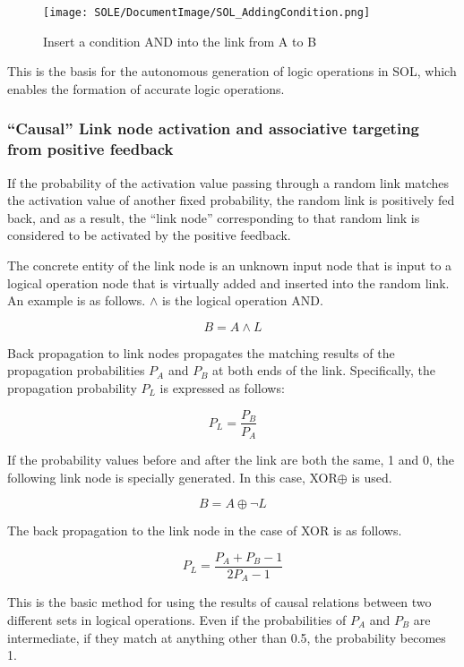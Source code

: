 \documentclass[12pt]{article}
\begin{document}
\begin{figure}[ht]
  \centering
  \texttt{[image: SOLE/DocumentImage/SOL\_AddingCondition.png]}
  \caption{Insert a condition AND into the link from A to B}
  \label{fig:insert_a_condition_cond_into_the_link_from_a_to_b}
\end{figure}

This is the basis for the autonomous generation of logic operations in
SOL, which enables the formation of accurate logic operations.

\subsubsection{``Causal'' Link node activation and associative
targeting from positive
feedback}\label{causal-link-node-activation-and-associative-targeting-from-positive-feedback}

If the probability of the activation value passing through a random link
matches the activation value of another fixed probability, the random
link is positively fed back, and as a result, the ``link node''
corresponding to that random link is considered to be activated by the
positive feedback.

The concrete entity of the link node is an unknown input node that is
input to a logical operation node that is virtually added and inserted
into the random link. An example is as follows. \(\land\) is the logical
operation AND.

\[B=A \land L\]

Back propagation to link nodes propagates the matching results of the
propagation probabilities \(P_{A}\) and \(P_{B}\) at both ends of the
link. Specifically, the propagation probability \(P_{L}\) is expressed
as follows:

\[ P_{L}=\frac{P_{B}}{P_{A}}\]

If the probability values \hspace{0pt}\hspace{0pt}before and after the
link are both the same, 1 and 0, the following link node is specially
generated. In this case, XOR\(\oplus\) is used.

\[B=A \oplus \neg L\]

The back propagation to the link node in the case of XOR is as follows.

\[ P_{L}=\frac{P_{A}+P_{B}-1}{2P_{A}-1}\]

This is the basic method for using the results of causal relations
between two different sets in logical operations. Even if the
probabilities of \(P_{A}\) and \(P_{B}\) are intermediate, if they match
at anything other than 0.5, the probability becomes 1.
\end{document}

